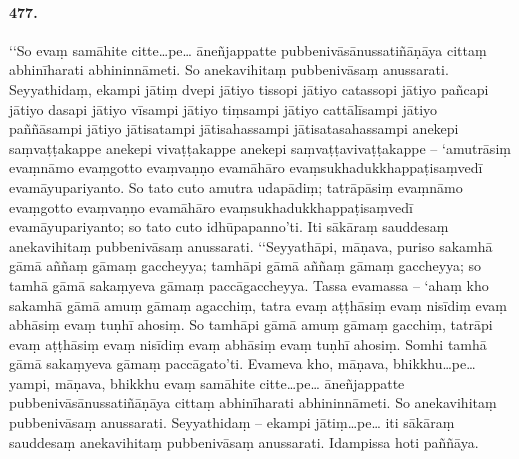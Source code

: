 \paragraph{477.} ‘‘So evaṃ samāhite citte…pe… āneñjappatte pubbenivāsānussatiñāṇāya cittaṃ abhinīharati abhininnāmeti. So anekavihitaṃ pubbenivāsaṃ anussarati. Seyyathidaṃ, ekampi jātiṃ dvepi jātiyo tissopi jātiyo catassopi jātiyo pañcapi jātiyo dasapi jātiyo vīsampi jātiyo tiṃsampi jātiyo cattālīsampi jātiyo paññāsampi jātiyo jātisatampi jātisahassampi jātisatasahassampi anekepi saṃvaṭṭakappe anekepi vivaṭṭakappe anekepi saṃvaṭṭavivaṭṭakappe – ‘amutrāsiṃ evaṃnāmo evaṃgotto evaṃvaṇṇo evamāhāro evaṃsukhadukkhappaṭisaṃvedī evamāyupariyanto. So tato cuto amutra udapādiṃ; tatrāpāsiṃ evaṃnāmo evaṃgotto evaṃvaṇṇo evamāhāro evaṃsukhadukkhappaṭisaṃvedī evamāyupariyanto; so tato cuto idhūpapanno’ti. Iti sākāraṃ sauddesaṃ anekavihitaṃ pubbenivāsaṃ anussarati. ‘‘Seyyathāpi, māṇava, puriso sakamhā gāmā aññaṃ gāmaṃ gaccheyya; tamhāpi gāmā aññaṃ gāmaṃ gaccheyya; so tamhā gāmā sakaṃyeva gāmaṃ paccāgaccheyya. Tassa evamassa – ‘ahaṃ kho sakamhā gāmā amuṃ gāmaṃ agacchiṃ, tatra evaṃ aṭṭhāsiṃ evaṃ nisīdiṃ evaṃ abhāsiṃ evaṃ tuṇhī ahosiṃ. So tamhāpi gāmā amuṃ gāmaṃ gacchiṃ, tatrāpi evaṃ aṭṭhāsiṃ evaṃ nisīdiṃ evaṃ abhāsiṃ evaṃ tuṇhī ahosiṃ. Somhi tamhā gāmā sakaṃyeva gāmaṃ paccāgato’ti. Evameva kho, māṇava, bhikkhu…pe… yampi, māṇava, bhikkhu evaṃ samāhite citte…pe… āneñjappatte pubbenivāsānussatiñāṇāya cittaṃ abhinīharati abhininnāmeti. So anekavihitaṃ pubbenivāsaṃ anussarati. Seyyathidaṃ – ekampi jātiṃ…pe… iti sākāraṃ sauddesaṃ anekavihitaṃ pubbenivāsaṃ anussarati. Idampissa hoti paññāya.


